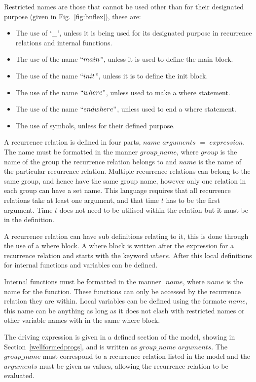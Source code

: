 \documentclass{article}
\begin{document}
Restricted names are those that cannot be used other than for their designated purpose (given in Fig.~\ref{fig:bnflex}), these are:
\begin{itemize}
  \item The use of $`\_$', unless it is being used for its designated purpose in recurrence relations and internal functions. 
  \item The use of the name $``main$'', unless it is used to define the main block.
  \item The use of the name $``init$'', unless it is to define the init block.
  \item The use of the name $``where"$, unless used to make a where statement.
  \item The use of the name $``endwhere"$, unless used to end a where statement.
  \item The use of symbols, unless for their defined purpose.  
\end{itemize}

A recurrence relation is defined in four parts, $name$ $arguments$ $=$ $expression$. The name must be formatted in the manner $group\_name$, where $group$ is the name of the group the recurrence relation belongs to and $name$ is the name of the particular recurrence relation. Multiple recurrence relations can belong to the same group, and hence have the same group name, however only one relation in each group can have a set name. This language requires that all recurrence relations take at least one argument, and that time $t$ has to be the first argument. Time $t$ does not need to be utilised within the relation but it must be in the definition.     

A recurrence relation can have sub definitions relating to it, this is done through the use of a where block. A where block is written after the expression for a recurrence relation and starts with the keyword $where$. After this local definitions for internal functions and variables can be defined. 

Internal functions must be formatted in the manner $\_name$, where $name$ is the name for the function. These functions can only be accessed by the recurrence relation they are within. Local variables can be defined using the formate $name$, this name can be anything as long as it does not clash with restricted names or other variable names with in the same where block. 

The driving expression is given in a defined section of the model, showing in Section~\ref{wellformedprogs}, and is written as  $group\_name$ $arguments$. The  $group\_name$ must correspond to a recurrence relation listed in the model and the $arguments$ must be given as values, allowing the recurrence relation to be evaluated. 
\end{document}
